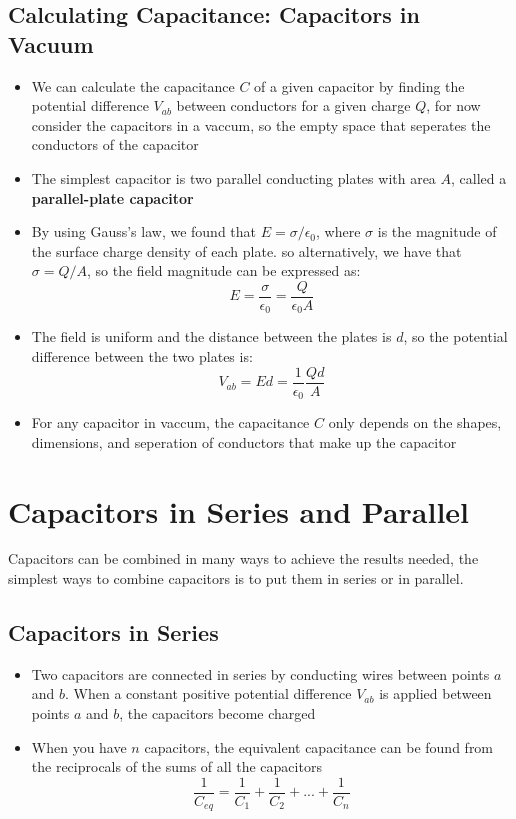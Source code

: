 \documentclass[11pt, a4paper]{article}
\begin{document}
\subsection{Calculating Capacitance: Capacitors in Vacuum}
\begin{itemize}
    \item We can calculate the capacitance $C$ of a given capacitor by finding the
        potential difference $V_{ab}$ between conductors for a given charge $Q$, for now
        consider the capacitors in a vaccum, so the empty space that seperates the
        conductors of the capacitor
    \item The simplest capacitor is two parallel conducting plates with area $A$, called
        a \textbf{parallel-plate capacitor}
    \item By using Gauss's law, we found that $E = \sigma / \epsilon_0$, where $\sigma$
        is the magnitude of the surface charge density of each plate. so alternatively,
        we have that $\sigma = Q / A$, so the field magnitude can be expressed as:
        \begin{equation}
            E = \frac{\sigma}{\epsilon_0} = \frac{Q}{\epsilon_0 A}
        \end{equation}
    \item The field is uniform and the distance between the plates is $d$, so the
        potential difference between the two plates is:
        \begin{equation}
            V_{ab} = Ed = \frac{1}{\epsilon_0} \frac{Qd}{A}
        \end{equation}
    \item For any capacitor in vaccum, the capacitance $C$ only depends on the shapes,
        dimensions, and seperation of conductors that make up the capacitor
\end{itemize}

\section[24.2, Capacitors in Series and Parallel]{Capacitors in Series and Parallel}
Capacitors can be combined in many ways to achieve the results needed, the simplest ways
to combine capacitors is to put them in series or in parallel.

\subsection{Capacitors in Series}
\begin{itemize}
    \item Two capacitors are connected in series by conducting wires between points $a$
        and $b$. When a constant positive potential difference $V_{ab}$ is applied
        between points $a$ and $b$, the capacitors become charged
    \item When you have $n$ capacitors, the equivalent capacitance can be found from the
        reciprocals of the sums of all the capacitors
        \begin{equation}
            \frac{1}{C_{eq}} = \frac{1}{C_1} + \frac{1}{C_2} + ... + \frac{1}{C_n}
        \end{equation}
\end{itemize}
\end{document}
